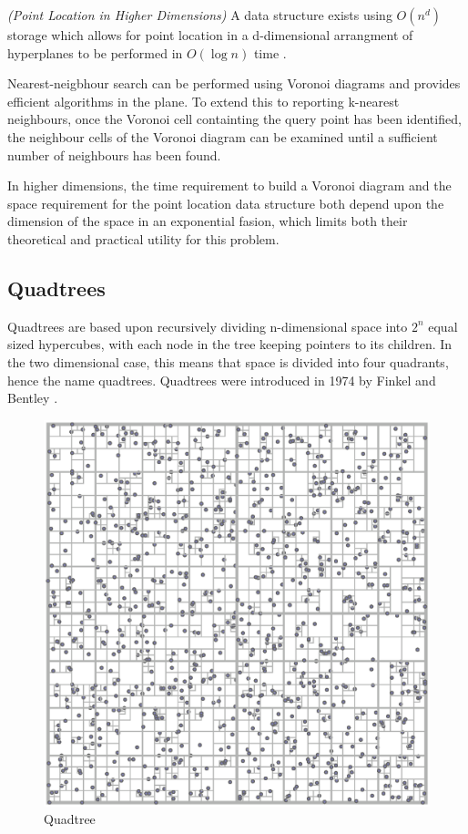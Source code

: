 \documentclass[mcs]{scsthesis}
\begin{document}
\begin{thm} \emph{(Point Location in Higher Dimensions)}
A data structure exists using \(O(n^d)\) storage which allows for  
point location in a d-dimensional arrangment of hyperplanes to be performed in
\(O(\log n)\) time \cite{chazelle}.
\end{thm}

Nearest-neigbhour search can be performed using Voronoi diagrams and provides
efficient algorithms in the plane. To extend this to reporting k-nearest
neighbours, once the Voronoi cell containting the query point has been
identified, the neighbour cells of the Voronoi diagram can be examined until
a sufficient number of neighbours has been found. 

In higher dimensions, the time requirement to build a Voronoi diagram and the
space requirement for the point location data structure both depend upon the
dimension of the space in an exponential fasion, which limits both their
theoretical and practical utility for this problem.

\subsection{Quadtrees}

Quadtrees are based upon recursively dividing n-dimensional space into \(2^n\)
equal sized hypercubes, with each node in the tree keeping pointers to its
children.  In the two dimensional case, this means that space is divided into
four quadrants, hence the name quadtrees. Quadtrees were introduced in 1974 by
Finkel and Bentley \cite{quadtree}. 

\begin{figure}
\begin{center}
\includegraphics[scale=0.35]{diagrams/quadtree.eps}
\caption{Quadtree}
\end{center}
\end{figure}
\end{document}
